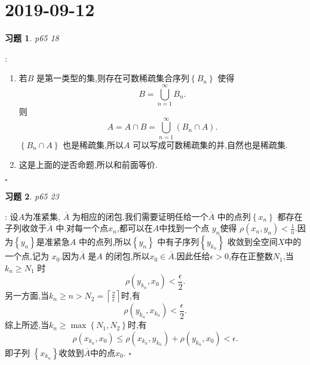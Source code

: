 \documentclass[a4paper]{article}
\newtheorem*{exe}{习题}
\newenvironment{sol}{{\noindent\bfseries 解}:}{\hfill $\square$\par}
\begin{document}
\section{2019-09-12}
\begin{exe}
  p65 18	
\end{exe}
\begin{sol}
  \begin{enumerate}
    \item   若$B$ 是第一类型的集,则存在可数稀疏集合序列$\left\{ B_n \right\} $ 使得 
  \[
  B=\bigcup_{n=1}^{\infty}B_n
  .\] 
  则
   \[
     A=A\cap B=\bigcup_{n=1} ^{\infty}\left( B_n \cap A \right) 
  .\] 
  $\left\{ B_n\cap A \right\} $ 也是稀疏集,所以$A$ 可以写成可数稀疏集的并,自然也是稀疏集.
   \item 这是上面的逆否命题,所以和前面等价.
   \end{enumerate}
\end{sol}
\begin{exe}
  p65 23
\end{exe}
\begin{sol}
  设$A$为准紧集, $\overline{A}$ 为相应的闭包.我们需要证明任给一个$\overline{A}$ 中的点列$\left\{ x_n \right\} $ 都存在子列收敛于$\overline{A}$ 中.对每一个点$x_n$,都可以在$A$中找到一个点 $y_n$使得 $\rho(x_n,y_n)<\frac{1}{n}$.因为$\left\{ y_n \right\} $是准紧急$A$ 中的点列,所以$\left\{ y_n \right\} $ 中有子序列$\left\{ y_{k_n} \right\} $ 收敛到全空间$X$中的一个点,记为 $x_0$.因为$\overline{A}$ 是$A$ 的闭包,所以$x_0\in \overline{A}$.因此任给$\epsilon >0$,存在正整数$N_1$,当 $k_n\ge N_1$ 时
  \[
    \rho(y_{k_n},x_0)<\frac{\epsilon }{2}
  .\] 
  另一方面,当$k_n\ge n>N_2=\left\lceil \frac{2}{\epsilon } \right\rceil $时,有
   \[
     \rho(y_{k_n},x_{k_n})<\frac{\epsilon }{2}
  .\] 
  综上所述,当$k_n\ge \max\left\{ N_1,N_2 \right\} $时,有
   \[
     \rho(x_{k_n},x_0)\le \rho(x_{k_n},y_{k_n})+\rho(y_{k_n},x_0)<\epsilon 
  .\] 
  即子列 $\left\{ x_{k_n} \right\} $收敛到$\overline{A}$中的点$x_0$.
\end{sol}
\end{document}
